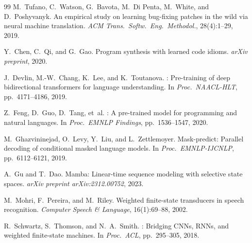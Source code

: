 \documentclass{article}
\begin{document}
\begin{thebibliography}{99}
M.~Tufano, C.~Watson, G.~Bavota, M.~{Di Penta}, M.~White, and D.~Poshyvanyk.
\newblock An empirical study on learning bug-fixing patches in the wild via
  neural machine translation.
\newblock \emph{ACM Trans.\ Softw.\ Eng.\ Methodol.}, 28(4):1--29, 2019.

Y.~Chen, C.~Qi, and G.~Gao.
\newblock Program synthesis with learned code idioms.
\newblock \emph{arXiv preprint}, 2020.

J.~Devlin, M.-W.~Chang, K.~Lee, and K.~Toutanova.
: Pre-training of deep bidirectional transformers for language
  understanding.
\newblock In \emph{Proc.\ NAACL-HLT}, pp.~4171--4186, 2019.

Z.~Feng, D.~Guo, D.~Tang, et~al.
: A pre-trained model for programming and natural languages.
\newblock In \emph{Proc.\ EMNLP Findings}, pp.~1536--1547, 2020.

M.~Ghazvininejad, O.~Levy, Y.~Liu, and L.~Zettlemoyer.
\newblock Mask-predict: Parallel decoding of conditional masked language models.
\newblock In \emph{Proc.\ EMNLP-IJCNLP}, pp.~6112--6121, 2019.

A.~Gu and T.~Dao.
\newblock Mamba: Linear-time sequence modeling with selective state spaces.
\newblock \emph{arXiv preprint arXiv:2312.00752}, 2023.

M.~Mohri, F.~Pereira, and M.~Riley.
\newblock Weighted finite-state transducers in speech recognition.
\newblock \emph{Computer Speech \& Language}, 16(1):69--88, 2002.

R.~Schwartz, S.~Thomson, and N.~A.~Smith.
: Bridging {CNN}s, {RNN}s, and weighted finite-state machines.
\newblock In \emph{Proc.\ ACL}, pp.~295--305, 2018.

\end{thebibliography}
\end{document}
